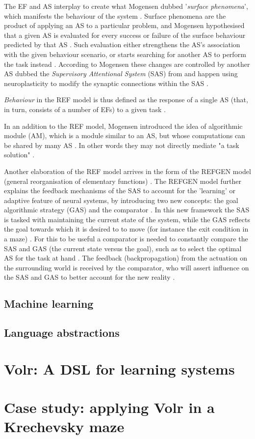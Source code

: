 \documentclass[a4paper,oneside]{memoir}
\begin{document}
The EF and AS interplay to create what Mogensen dubbed '\textit{surface
phenomena}', which manifests the behaviour of the system \autocite{Mogensen2011}.
Surface phenomena are the product of applying an AS to a particular problem,
and Mogensen hypothesised that a given AS is evaluated for every success or
failure of the surface behaviour predicted by that AS \autocite{Mogensen2011}.
Such evaluation either strengthens the AS's association with the given
behaviour scenario, or starts searching for another AS to perform the task
instead \autocite{Mogensen2011}. According to Mogensen these changes
are controlled by another AS dubbed the \textit{Supervisory Attentional
System} (SAS) from \autocite{Norman1986} and happen using neuroplasticity to
modify the synaptic connections within the SAS \autocite{Mogensen2011}.

\textit{Behaviour} in the REF model is thus defined as the response of a single
AS (that, in turn, consists of a number of EFs) to a given task
\autocite{Mogensen2011, Mogensen2012b}.

In an addition to the REF model, Mogensen introduced the idea of algorithmic
module (AM), which is a module similar to an AS, but whose computations can be
shared by many AS \autocite{Mogensen2012b}. In other words they may not
directly mediate "a task solution" \autocite{Mogensen2017}.

Another elaboration of the REF model arrives in the form of the REFGEN
model (general reorganisation of elementary functions) \autocite{Mogensen2017}.
The REFGEN model further explains the feedback mechanisms of the SAS
to account for the 'learning' or adaptive feature of neural systems, by
introducing two new concepts: the goal algorithmic strategy (GAS) and the
comparator \autocite{Mogensen2017, Mogensen2012b}.
In this new framework the SAS is tasked with maintaining the current state
of the system, while the GAS reflects the goal towards which it is desired to
to move (for instance the exit condition in a maze) \autocite{Mogensen2017}.
For this to be useful a comparator is needed to constantly compare the SAS
and GAS (the current state versus the goal), such as to select the optimal AS
for the task at hand \autocite{Mogensen2017}. The feedback (backpropagation)
from the actuation on the surrounding world is received by the comparator,
who will assert influence on the SAS and GAS to better account for the new
reality \autocite{Mogensen2017}.


\subsection{Machine learning}

\subsection{Language abstractions}

\section{Volr: A DSL for learning systems}
\label{volr}

\section{Case study: applying Volr in a Krechevsky maze}
\label{case}

\clearpage

\printglossary

\printbibliography
\end{document}

